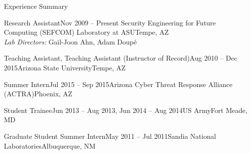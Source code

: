 
\begin{rSection}{Experience Summary}


  \begin{rExperienceHeader}{Research Assistant}{Nov 2009 -- Present}%
      {Security Engineering for Future Computing (SEFCOM) Laboratory at ASU}{Tempe, AZ\\
      \emph{Lab Directors:} Gail-Joon Ahn, Adam Doup\'{e}}
  \end{rExperienceHeader}


  \begin{rExperienceHeader}{Teaching Assistant, Teaching Assistant (Instructor of Record)}{Aug 2010 -- Dec 2015}{Arizona State University}{Tempe, AZ}
  \end{rExperienceHeader}


\begin{rExperienceHeader}{Summer Intern}{Jul 2015 -- Sep 2015}{Arizona Cyber Threat Response Alliance (ACTRA)}{Phoenix, AZ}
\end{rExperienceHeader}


\begin{rExperienceHeader}{Student Trainee}{Jun 2013 -- Aug 2013, Jun 2014 -- Aug 2014}{US Army}{Fort Meade, MD}
\end{rExperienceHeader}


\begin{rExperienceHeader}{Graduate Student Summer Intern}{May 2011 -- Jul 2011}{Sandia National Laboratories}{Albuquerque, NM}
\end{rExperienceHeader}



\end{rSection}
